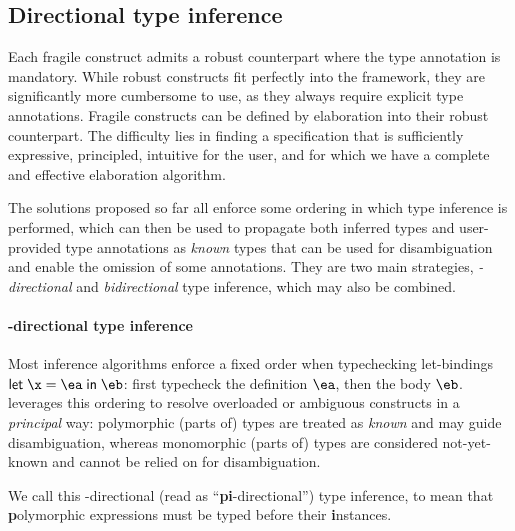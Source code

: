 \documentclass[acmsmall,screen,nonacm,review]{acmart}
\begin{document}
\subsection{Directional type inference}

Each fragile construct admits
a robust counterpart where the type annotation is mandatory. While
robust constructs fit perfectly into the \ML framework, they are
significantly more cumbersome to use, as they always require explicit type
annotations. Fragile constructs can be defined by elaboration into their
robust counterpart.
%
%
The difficulty lies in finding a specification
that is sufficiently expressive, principled, intuitive for the user,
and for which we have a complete and effective elaboration algorithm.

The solutions proposed so far all enforce some ordering in which type
inference is performed, which can then be used to propagate both inferred
types and user-provided type annotations as \emph{known} types that can be
used for disambiguation and enable the omission of some annotations.
They are two main strategies, \emph{\geninst-directional} and
\emph{bidirectional} type inference, which may also be combined.

\paragraph{\Geninst-directional type inference}


Most \ML inference algorithms enforce a fixed order when typechecking
let-bindings $\elet \x \ea \eb$: first typecheck the definition $\ea$, then
the body $\eb$. \OCaml leverages this ordering to resolve overloaded or
ambiguous constructs in a \emph{principal} way: polymorphic (parts of) types
are treated as \emph{known} and may guide disambiguation, whereas
monomorphic (parts of) types are considered not-yet-known and cannot be
relied on for disambiguation.


We call this \textbf{\geninst}-directional (read as
``\textbf{pi}-directional'') type inference, to mean that
\textbf{p}olymorphic expressions must be typed before their
\textbf{i}nstances.
\end{document}

